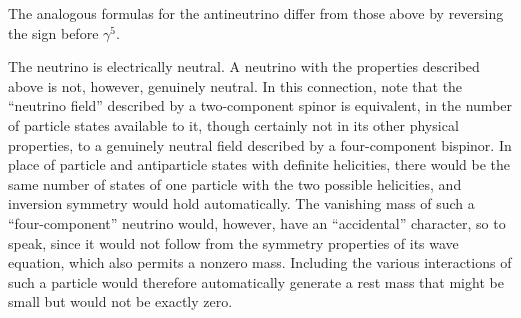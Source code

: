 The analogous formulas for the antineutrino differ from those above by reversing the sign before $\gamma^5$.

The neutrino is electrically neutral. A neutrino with the properties described above is not, however, genuinely neutral. In this connection, note that the ``neutrino field'' described by a two-component spinor is equivalent, in the number of particle states available to it, though certainly not in its other physical properties, to a genuinely neutral field described by a four-component bispinor. In place of particle and antiparticle states with definite helicities, there would be the same number of states of one particle with the two possible helicities, and inversion symmetry would hold automatically. The vanishing mass of such a ``four-component'' neutrino would, however, have an ``accidental'' character, so to speak, since it would not follow from the symmetry properties of its wave equation, which also permits a nonzero mass. Including the various interactions of such a particle would therefore automatically generate a rest mass that might be small but would not be exactly zero.
